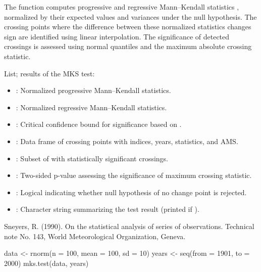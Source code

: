 \documentclass[a4paper]{book}
\begin{document}
%
\begin{Details}
The function computes progressive and regressive Mann–Kendall statistics ,
normalized by their expected values and variances under the null hypothesis. The crossing
points where the difference between these normalized statistics changes sign are
identified using linear interpolation. The significance of detected crossings is
assessed using normal quantiles and the maximum absolute crossing statistic.
\end{Details}
%
\begin{Value}
List; results of the MKS test:
\begin{itemize}

\item{} : Normalized progressive Mann–Kendall statistics.
\item{} : Normalized regressive Mann–Kendall statistics.
\item{} : Critical confidence bound for significance based on .
\item{} : Data frame of crossing points with indices, years, statistics, and AMS.
\item{} : Subset of  with statistically significant crossings.
\item{} : Two-sided p-value assessing the significance of maximum crossing statistic.
\item{} : Logical indicating whether null hypothesis of no change point is rejected.
\item{} : Character string summarizing the test result (printed if ).

\end{itemize}

\end{Value}
%
\begin{References}
Sneyers, R. (1990). On the statistical analysis of series of observations.
Technical note No. 143, World Meteorological Organization, Geneva.
\end{References}
%
\begin{SeeAlso}
\end{SeeAlso}
%
\begin{Examples}
\begin{ExampleCode}
data <- rnorm(n = 100, mean = 100, sd = 10)
years <- seq(from = 1901, to = 2000)
mks.test(data, years)

\end{ExampleCode}
\end{Examples}
\end{document}
